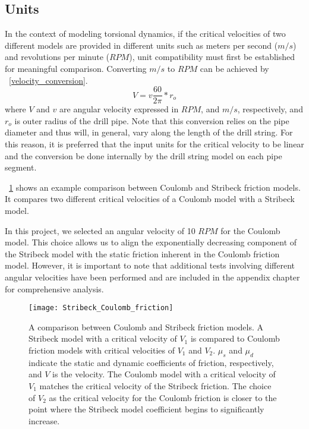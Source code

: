 \subsection{Units}
In the context of modeling torsional dynamics, if the critical velocities of two different models are provided in different units such as meters per second ($m/s$) and revolutions per minute ($RPM$), unit compatibility must first be established for meaningful comparison. Converting $m/s$ to $RPM$ can be achieved by \equationname~\ref{velocity_conversion}.
\begin{equation}\label{velocity_conversion}
  V=v\frac{60}{2\pi}*r_o
\end{equation}
where $V$ and $v$ are angular velocity expressed in $RPM$, and $m/s$, respectively, and $r_o$ is outer radius of the drill pipe.  Note that this conversion relies on the pipe diameter and thus will, in general, vary along the length of the drill string.  For this reason, it is preferred that the input units for the critical velocity to be linear and the conversion be done internally by the drill string model on each pipe segment.




\figurename~\ref{figure:stribeck_coulomb_friction} shows an example comparison between Coulomb and Stribeck friction models. It compares two different critical velocities of a Coulomb model with a Stribeck model.

In this project, we selected an angular velocity of 10 $RPM$ for the Coulomb model. This choice allows us to align the exponentially decreasing component of the Stribeck model with the static friction inherent in the Coulomb friction model. However, it is important to note that additional tests involving different angular velocities have been performed and are included in the appendix chapter for comprehensive analysis. 

\begin{figure}
  \centering
  \texttt{[image: Stribeck\_Coulomb\_friction]}
  \caption[Comparison between Coulomb and Stribeck friction model]{A comparison between Coulomb and Stribeck friction models. A Stribeck model with a critical velocity of $V_1$ is compared to Coulomb friction models with critical velocities of $V_1$ and $V_2$. $\mu_s$ and $\mu_d$ indicate the static and dynamic coefficients of friction, respectively, and $V$ is the velocity.  The Coulomb model with a critical velocity of $V_1$ matches the critical velocity of the Stribeck friction.  The choice of $V_2$ as the critical velocity for the Coulomb friction is closer to the point where the Stribeck model coefficient begins to significantly increase.}\label{figure:stribeck_coulomb_friction}
\end{figure}

